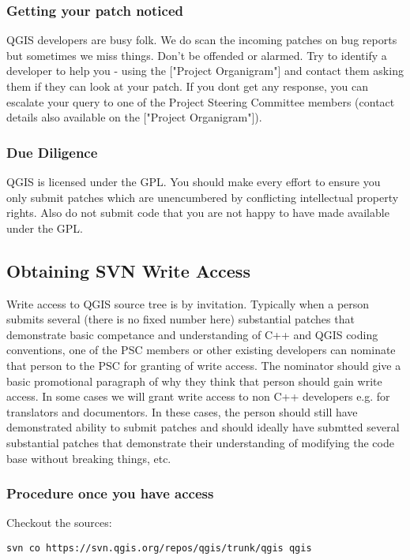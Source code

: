 \subsubsection{Getting your patch noticed}
QGIS developers are busy folk. We do scan the incoming patches on bug reports but sometimes we miss things. 
Don't be offended or alarmed. Try to identify a developer to help you - using the ["Project Organigram"] and 
contact them asking them if they can look at your patch. If you dont get any response, you can escalate your 
query to one of the Project Steering Committee members (contact details also available on the ["Project Organigram"]).

\subsubsection{Due Diligence}
QGIS is licensed under the GPL. You should make every effort to ensure you only submit patches which are 
unencumbered by conflicting intellectual property rights. Also do not submit code that you are not happy to 
have made available under the GPL.

\subsection{Obtaining SVN Write Access}
Write access to QGIS source tree is by invitation. Typically when a person submits several (there is no fixed 
number here) substantial patches that demonstrate basic competance and understanding of C++ and QGIS coding 
conventions, one of the PSC members or other existing developers can nominate that person to the PSC for granting 
of write access. The nominator should give a basic promotional paragraph of why they think that person should gain 
write access. In some cases we will grant write access to non C++ developers e.g. for translators and documentors. 
In these cases, the person should still have demonstrated ability to submit patches and should ideally have submtted 
several substantial patches that demonstrate their understanding of modifying the code base without breaking things, etc.

\subsubsection{Procedure once you have access}
Checkout the sources:

\begin{verbatim}
svn co https://svn.qgis.org/repos/qgis/trunk/qgis qgis
\end{verbatim}

